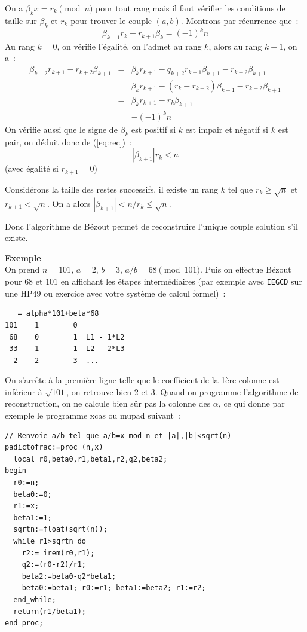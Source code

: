 \documentclass[a4paper,11pt]{article}
\begin{document}
On a $ \beta_k x= r_k \pmod n$ pour tout rang mais il faut v\'erifier
les conditions de taille sur $\beta_k$ et $r_k$ pour trouver le couple
$(a,b)$.
Montrons par r\'ecurrence que~:
\begin{equation} \label{eq:rec}
 \beta_{k+1} r_k - r_{k+1} \beta_k = (-1)^k n 
\end{equation}
Au rang $k=0$, on v\'erifie l'\'egalit\'e, on l'admet au rang $k$, 
alors au rang $k+1$, on a~:
\begin{eqnarray*}
 \beta_{k+2} r_{k+1} - r_{k+2} \beta_{k+1} 
& = & \beta_k r_{k+1} - q_{k+2} r_{k+1} \beta_{k+1}  - r_{k+2} \beta_{k+1} \\
& = & \beta_k r_{k+1} - (r_{k}-r_{k+2}) \beta_{k+1}  - r_{k+2} \beta_{k+1} \\
& = & \beta_k r_{k+1} - r_{k} \beta_{k+1} \\
& = & - (-1)^k n
\end{eqnarray*}
On v\'erifie aussi que le signe de $\beta_k$ est positif si $k$ est impair
et n\'egatif si $k$ est pair, on d\'eduit donc de (\ref{eq:rec})~:
\[ |\beta_{k+1}| r_k < n \]
(avec \'egalit\'e si $r_{k+1}=0$)

Consid\'erons la taille des restes successifs, il existe un rang $k$
tel que $r_k \geq \sqrt{n}$ et $r_{k+1}<\sqrt{n}$. On a alors
$|\beta_{k+1}|  < n/r_k \leq \sqrt{n}$.

Donc l'algorithme de Bézout permet de reconstruire l'unique couple
solution s'il existe.

{\bf Exemple}\\
On prend $n=101$, $a=2$, $b=3$, $a/b=68 \pmod {101}$.
Puis on effectue Bézout pour $68$ et $101$ en affichant les étapes 
intermédiaires (par exemple avec \verb|IEGCD| sur une HP49 ou exercice
avec votre système de calcul formel)~:
\begin{verbatim}
   = alpha*101+beta*68
101    1        0
 68    0        1  L1 - 1*L2
 33    1       -1  L2 - 2*L3
  2   -2        3  ...
\end{verbatim}
On s'arrête à la première ligne telle que le coefficient de la 1ère colonne
est inférieur à $\sqrt{101}$, on retrouve bien $2$ et $3$.
Quand on programme l'algorithme de
reconstruction, on ne calcule bien sûr pas la colonne des $\alpha$,
ce qui donne par exemple le programme xcas ou mupad suivant~:
\begin{verbatim}
// Renvoie a/b tel que a/b=x mod n et |a|,|b|<sqrt(n)
padictofrac:=proc (n,x)
  local r0,beta0,r1,beta1,r2,q2,beta2;
begin
  r0:=n;
  beta0:=0;
  r1:=x;
  beta1:=1;
  sqrtn:=float(sqrt(n));
  while r1>sqrtn do
    r2:= irem(r0,r1); 
    q2:=(r0-r2)/r1;
    beta2:=beta0-q2*beta1;
    beta0:=beta1; r0:=r1; beta1:=beta2; r1:=r2;
  end_while;
  return(r1/beta1);
end_proc;
\end{verbatim}
\end{document}
